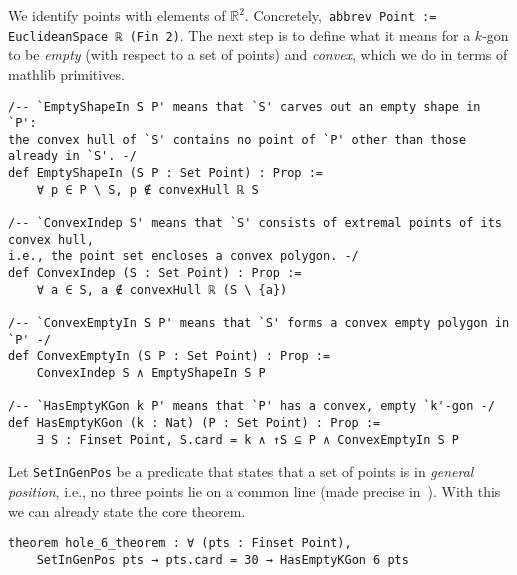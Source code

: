 We identify points with elements of $\mathbb{R}^2$. Concretely,~\lstinline|abbrev Point := EuclideanSpace ℝ (Fin 2)|.
The next step is to define what it means for a $k$-gon to be \emph{empty} (with respect to a set of points) and \emph{convex}, which we do in terms of \textsf{mathlib} primitives.

\begin{lstlisting}
/-- `EmptyShapeIn S P' means that `S' carves out an empty shape in `P':
the convex hull of `S' contains no point of `P' other than those already in `S'. -/
def EmptyShapeIn (S P : Set Point) : Prop :=
    ∀ p ∈ P \ S, p ∉ convexHull ℝ S

/-- `ConvexIndep S' means that `S' consists of extremal points of its convex hull,
i.e., the point set encloses a convex polygon. -/
def ConvexIndep (S : Set Point) : Prop :=
    ∀ a ∈ S, a ∉ convexHull ℝ (S \ {a})

/-- `ConvexEmptyIn S P' means that `S' forms a convex empty polygon in `P' -/
def ConvexEmptyIn (S P : Set Point) : Prop :=
    ConvexIndep S ∧ EmptyShapeIn S P

/-- `HasEmptyKGon k P' means that `P' has a convex, empty `k'-gon -/
def HasEmptyKGon (k : Nat) (P : Set Point) : Prop :=
    ∃ S : Finset Point, S.card = k ∧ ↑S ⊆ P ∧ ConvexEmptyIn S P
\end{lstlisting}

Let \lstinline|SetInGenPos| be a predicate that states that a set of points is in \emph{general position}, i.e., no three points lie on a common line (made precise in~).
With this we can already state the core theorem.

\begin{lstlisting}
theorem hole_6_theorem : ∀ (pts : Finset Point),
    SetInGenPos pts → pts.card = 30 → HasEmptyKGon 6 pts
\end{lstlisting}

